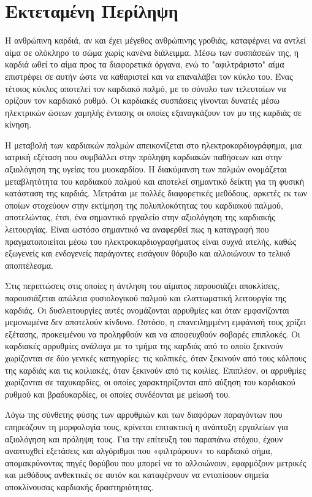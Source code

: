 \gr
\chapter*{Εκτεταμένη Περίληψη}
Η ανθρώπινη καρδιά, αν και έχει μέγεθος ανθρώπινης γροθιάς, καταφέρνει να αντλεί αίμα σε ολόκληρο το σώμα χωρίς κανένα διάλειμμα. Μέσω των συσπάσεών της, η καρδιά ωθεί το αίμα προς τα διαφορετικά όργανα, ενώ το "αφιλτράριστο" αίμα επιστρέφει σε αυτήν ώστε να καθαριστεί και να επαναλάβει τον κύκλο του. Ένας τέτοιος κύκλος αποτελεί τον καρδιακό παλμό, με το σύνολο των τελευταίων να ορίζουν τον καρδιακό ρυθμό. Οι καρδιακές συσπάσεις γίνονται δυνατές μέσω ηλεκτρικών ώσεων χαμηλής έντασης οι οποίες εξαναγκάζουν τον μυ της καρδιάς σε κίνηση.
\par
Η μεταβολή των καρδιακών παλμών απεικονίζεται στο ηλεκτροκαρδιογράφημα, μια ιατρική εξέταση που συμβάλλει στην πρόληψη καρδιακών παθήσεων και στην αξιολόγηση της υγείας του μυοκαρδίου. Η διακύμανση των παλμών ονομάζεται μεταβλητότητα του καρδιακού παλμού και αποτελεί σημαντικό δείκτη για τη φυσική κατάσταση της καρδιάς. Μετράται με πολλές διαφορετικές μεθόδους, αρκετές εκ των οποίων στοχεύουν στην εκτίμηση της πολυπλοκότητας του καρδιακού παλμού, αποτελώντας, έτσι, ένα σημαντικό εργαλείο στην αξιολόγηση της καρδιακής λειτουργίας. Είναι ωστόσο σημαντικό να αναφερθεί πως η καταγραφή που πραγματοποιείται μέσω του ηλεκτροκαρδιογραφήματος είναι συχνά ατελής, καθώς εξωγενείς και ενδογενείς παράγοντες εισάγουν θόρυβο και αλλοιώνουν το τελικό αποπτέλεσμα.
\par
Στις περιπτώσεις στις οποίες η άντληση του αίματος παρουσιάζει αποκλίσεις, παρουσιάζεται απώλεια φυσιολογικού παλμού και ελαττωματική λειτουργία της καρδιάς. Οι δυσλειτουργίες αυτές ονομάζονται αρρυθμίες και όταν εμφανίζονται μεμονωμένα δεν αποτελούν κίνδυνο. Ωστόσο, η επανειλημμένη εμφάνισή τους χρίζει εξέτασης, προκειμένου να προληφθούν και να αποφευχθούν σοβαρές επιπλοκές. Οι καρδιακές αρρυθμίες ανάλογα με το τμήμα της καρδιάς από το οποίο ξεκινούν χωρίζονται σε δύο γενικές κατηγορίες: τις κολπικές, όταν ξεκινούν από τους κόλπους της καρδιάς και τις κοιλιακές, όταν ξεκινούν από τις κοιλίες. Επιπλέον, οι αρρυθμίες χωρίζονται σε ταχυκαρδίες, οι οποίες χαρακτηρίζονται από αύξηση του καρδιακού ρυθμού και βραδυκαρδίες, οι οποίες συνδέονται με μείωσή του.
\par
Λόγω της σύνθετης φύσης των αρρυθμιών και των διαφόρων παραγόντων που επηρεάζουν τη μορφολογία τους, κρίνεται επιτακτική η ανάπτυξη εργαλείων για αξιολόγηση και πρόληψη τους. Για την επίτευξη του παραπάνω στόχου, έχουν αναπτυχθεί εξετάσεις και αλγόριθμοι που «φιλτράρουν» το καρδιακό σήμα, απομακρύνοντας πηγές θορύβου που μπορεί να το αλλοιώνουν, εφαρμόζουν μετρικές και μεθόδους ανθεκτικές σε αυτόν και καταφέρνουν να εντοπίσουν σημεία αποκλίνουσας καρδιακής δραστηριότητας. 
